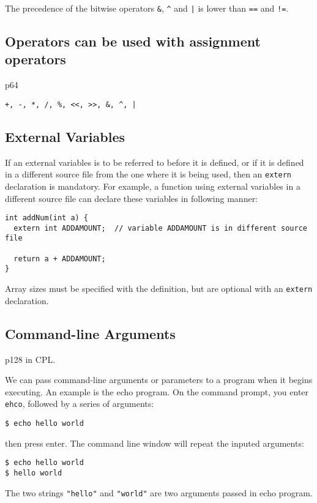 \documentclass[12pt]{article}
\begin{document}
The precedence of the bitwise operators \texttt{\&}, \texttt{\textasciicircum{}} and \texttt{|} is lower than \texttt{==} and \texttt{!=}.
\subsection{Operators can be used with assignment operators}
\label{sec:org7683ac4}
p64

\texttt{+, -, *, /, \%, <<, >>, \&, \textasciicircum{}, |}
\subsection{External Variables}
\label{sec:org952f56b}
If an external variables is to be referred to before it is defined, or if it is defined in a different source file from the one where it is being used, then an \texttt{extern} declaration is mandatory. For example, a function using external variables in a different source file can declare these variables in following manner:
\begin{verbatim}
int addNum(int a) {
  extern int ADDAMOUNT;  // variable ADDAMOUNT is in different source file

  return a + ADDAMOUNT;
}
\end{verbatim}
Array sizes must be specified with the definition, but are optional with an \texttt{extern} declaration.
\subsection{Command-line Arguments}
\label{sec:org97ccd60}
p128 in CPL.

We can pass command-line arguments or parameters to a program when it begins executing. An example is the echo program. On the command prompt, you enter \texttt{ehco}, followed by a series of arguments:
\begin{verbatim}
$ echo hello world
\end{verbatim}
then press enter. The command line window will repeat the inputed arguments:
\begin{verbatim}
$ echo hello world
$ hello world
\end{verbatim}
The two strings \texttt{"hello"} and \texttt{"world"} are two arguments passed in echo program.
\end{document}
